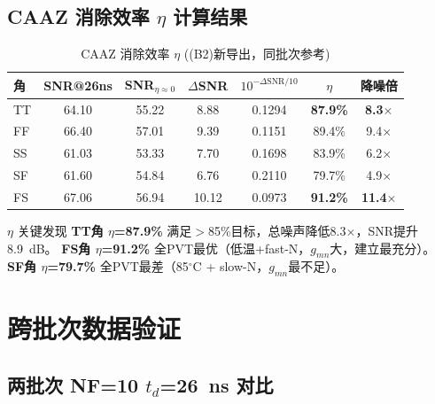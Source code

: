 \documentclass[11pt,a4paper,UTF8]{ctexart}
\newcommand{\keydata}[1]{\textbf{\color{primaryblue}#1}}
\begin{document}
\subsection{CAAZ 消除效率 $\eta$ 计算结果}

\begin{table}[htbp]
\centering
\caption{CAAZ 消除效率 $\eta$ ((B2)新导出，同批次参考)}
\label{tab:eta-new}
\footnotesize
\begin{tabular}{lcccccc}
\toprule
\textbf{角} & \textbf{SNR@26ns} & \textbf{SNR$_{\eta\approx0}$} & $\Delta$\textbf{SNR} & $10^{-\Delta\text{SNR}/10}$ & $\eta$ & \textbf{降噪倍} \\
\midrule
TT & 64.10 & 55.22 & 8.88 & 0.1294 & \keydata{87.9\%} & \keydata{8.3$\times$} \\

FF & 66.40 & 57.01 & 9.39 & 0.1151 & 89.4\% & 9.4$\times$ \\
SS & 61.03 & 53.33 & 7.70 & 0.1698 & 83.9\% & 6.2$\times$ \\

SF & 61.60 & 54.84 & 6.76 & 0.2110 & 79.7\% & 4.9$\times$ \\
FS & 67.06 & 56.94 & 10.12 & 0.0973 & \keydata{91.2\%} & \keydata{11.4$\times$} \\
\bottomrule
\end{tabular}
\normalsize
\end{table}

\begin{resultbox}{$\eta$ 关键发现}
\textbf{TT角 $\eta$=87.9\%} 满足$>$85\%目标，总噪声降低8.3$\times$，SNR提升8.9~dB。
\textbf{FS角 $\eta$=91.2\%} 全PVT最优（低温+fast-N，$g_{mn}$大，建立最充分）。
\textbf{SF角 $\eta$=79.7\%} 全PVT最差（85$^\circ$C + slow-N，$g_{mn}$最不足）。
\end{resultbox}

\section{跨批次数据验证}
\label{sec:crossbatch}

\subsection{两批次 NF=10 $t_d$=26~ns 对比}
\end{document}
